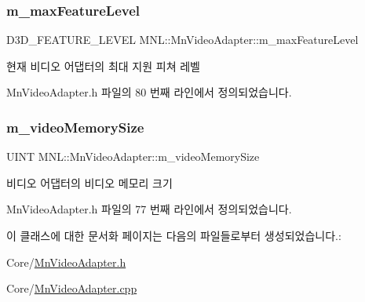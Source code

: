 \subsubsection{\texorpdfstring{m\+\_\+max\+Feature\+Level}{m\_maxFeatureLevel}}
{\footnotesize\ttfamily D3\+D\+\_\+\+F\+E\+A\+T\+U\+R\+E\+\_\+\+L\+E\+V\+EL M\+N\+L\+::\+Mn\+Video\+Adapter\+::m\+\_\+max\+Feature\+Level\hspace{0.3cm}{\ttfamily [private]}}



현재 비디오 어댑터의 최대 지원 피쳐 레벨 



Mn\+Video\+Adapter.\+h 파일의 80 번째 라인에서 정의되었습니다.

\mbox{\label{class_m_n_l_1_1_mn_video_adapter_a3b36c9861c046a731ca8ad1f90c8620b}} 
\subsubsection{\texorpdfstring{m\+\_\+video\+Memory\+Size}{m\_videoMemorySize}}
{\footnotesize\ttfamily U\+I\+NT M\+N\+L\+::\+Mn\+Video\+Adapter\+::m\+\_\+video\+Memory\+Size\hspace{0.3cm}{\ttfamily [private]}}



비디오 어댑터의 비디오 메모리 크기 



Mn\+Video\+Adapter.\+h 파일의 77 번째 라인에서 정의되었습니다.



이 클래스에 대한 문서화 페이지는 다음의 파일들로부터 생성되었습니다.\+:\begin{DoxyCompactItemize}
\item 
Core/\hyperlink{_mn_video_adapter_8h}{Mn\+Video\+Adapter.\+h}\item 
Core/\hyperlink{_mn_video_adapter_8cpp}{Mn\+Video\+Adapter.\+cpp}\end{DoxyCompactItemize}
